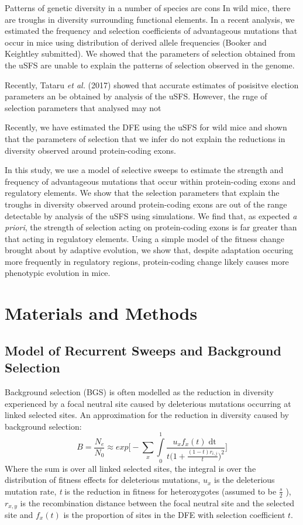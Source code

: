 \documentclass[11pt]{article}
\begin{document}
Patterns of genetic diversity in a number of species are cons
In wild mice, there are troughs in diversity surrounding functional elements. In a recent analysis, we estimated the frequency and selection coefficients of advantageous mutations that occur in mice using distribution of derived allele frequencies (Booker and Keightley submitted). We showed that the parameters of selection obtained from the uSFS are unable to explain the patterns of selection observed in the genome.

Recently, Tataru \textit{et al.} (2017) showed that accurate estimates of posisitve election parameters an be obtained by analysis of the uSFS. However, the rnge of selection parameters that analysed may not

Recently, we have estimated the DFE using the uSFS for wild mice and shown that the parameters of selection that we infer do not explain the reductions in diversity observed around protein-coding exons. 

In this study, we use a model of selective sweeps to estimate the strength and frequency of advantageous mutations that occur within protein-coding exons and regulatory elements. We show that the selection parameters that explain the troughs in diversity observed around protein-coding exons are out of the range detectable by analysis of the uSFS using simulations.  We find that, as expected \textit{a priori}, the strength of selection acting on protein-coding exons is far greater than that acting in regulatory elements. Using a simple model of the fitness change brought about by adaptive evolution, we show that, despite adaptation occuring more frequently in regulatory regions, protein-coding change likely causes more phenotypic evolution in mice.


\section*{Materials and Methods}

	\subsection*{Model of Recurrent Sweeps and Background Selection}
Background selection (BGS) is often modelled as the reduction in diversity experienced by a focal neutral site caused by deleterious mutations occurring at linked selected sites. An approximation for the reduction in diversity caused by background selection:
\begin{equation}
B = \frac{N_{e}}{N_{0}} \approx exp\Bigg[- \sum \limits_{x} \int \limits_{0}^1 \frac{u_{x}f_x(t)\mathop{dt}}{t \Big( 1 + \frac{(1-t)r_{i,j}}{t} \Big)^2} \Bigg]
\end{equation}
Where the sum is over all linked selected sites, the integral is over the distribution of fitness effects for deleterious mutations, \emph{$u_{x}$} is the deleterious mutation rate, \emph{t} is the reduction in fitness for heterozygotes (assumed to be \(\frac{s}{2}\) ), $r_{x,y}$  is the recombination distance between the focal neutral site and the selected site and $f_x(t)$ is the proportion of sites in the DFE with selection coefficient $t$.
\end{document}
